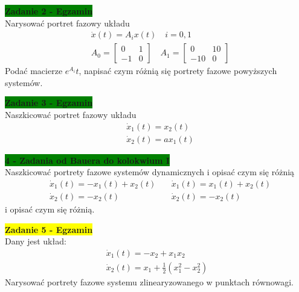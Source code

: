 \documentclass[a4paper,11pt]{article}
\begin{document}
\begin{framed}
\textbf{\colorbox{green}{Zadanie 2 - Egzamin} } \\ 
Narysować portret fazowy układu
\begin{align*}
&\dot{x}(t)=A_{i}x(t) \quad
i = 0,1 \\
&A_{0} = 
\begin{bmatrix}
0 & 1 \\
-1 & 0
\end{bmatrix}
\quad
A_{1} = 
\begin{bmatrix}
0 & 10 \\
-10 & 0
\end{bmatrix}
\end{align*}
Podać macierze \( e^{A_{i}}t \), napisać czym różnią się portrety fazowe powyższych systemów.
\end{framed}

\begin{framed}
\textbf{\colorbox{green}{Zadanie 3 - Egzamin} } \\ 
Naszkicować portret fazowy układu
\begin{align*}
&\dot{x}_{1}(t)=x_{2}(t) \\
&\dot{x}_{2}(t)=ax_{1}(t)
\end{align*}
\end{framed}

\begin{framed}
\textbf{\colorbox{green}{ 4 - Zadania od Bauera do kolokwium I }} \\ 
Naszkicować portrety fazowe systemów dynamicznych i opisać czym się różnią
\begin{align*}
&\dot{x}_{1}(t)=-x_{1}(t)+x_{2}(t) \quad &\dot{x}_{1}(t)=x_{1}(t)+x_{2}(t) \\
&\dot{x}_{2}(t)=-x_{2}(t) \quad &\dot{x}_{2}(t)=-x_{2}(t) 
\end{align*}
i opisać czym się różnią.
\end{framed}


\begin{framed}
\textbf{\colorbox{yellow}{Zadanie 5 - Egzamin}}  \\ 
Dany jest układ:
\begin{align*}
\dot{x}_{1}(t)=-x_2+x_1x_2 \\
\dot{x}_{2}(t)=x_1+\frac{1}{2}(x_1^2-x_2^2)
\end{align*}
Narysować portrety fazowe systemu zlinearyzowanego w punktach równowagi.
\end{framed}

\newpage
\end{document}
